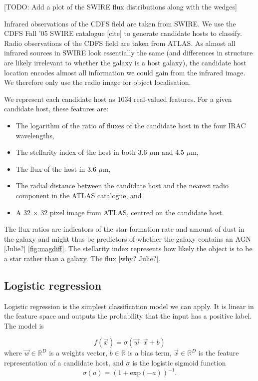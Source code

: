 \documentclass[fleqn,usenatbib,usedcolumn]{mnras}
\begin{document}
    {[}TODO: Add a plot of the SWIRE flux distributions along with the
    wedges{]}

    Infrared observations of the CDFS field are taken from SWIRE. We use the
    CDFS Fall '05 SWIRE catalogue {[}cite{]} to generate candidate hosts to
    classify. Radio observations of the CDFS field are taken from ATLAS. As
    almost all infrared sources in SWIRE look essentially the same (and
    differences in structure are likely irrelevant to whether the galaxy is
    a host galaxy), the candidate host location encodes almost all
    information we could gain from the infrared image. We therefore only use
    the radio image for object localisation.

    We represent each candidate host as 1034 real-valued features. For a given
    candidate host, these features are:
    \begin{itemize}
      \item The logarithm of the ratio of fluxes of the candidate host in the
        four IRAC wavelengths,
      \item The stellarity index of the host in both 3.6 $\mu$m and 4.5
        $\mu$m,
      \item The flux of the host in 3.6 $\mu$m,
      \item The radial distance between the candidate host and the nearest
        radio component in the ATLAS catalogue, and
      \item A 32 $\times$ 32 pixel image from ATLAS, centred on the candidate
        host.
    \end{itemize}

    The flux ratios are indicators of the star formation rate and amount of
    dust in the galaxy and might thus be predictors of whether the galaxy
    contains an AGN {[}Julie?{]} \ref{fig:magdiff}. The stellarity index
    represents how likely the object is to be a star rather than a galaxy.
    The flux {[}why? Julie?{]}.

  \subsection{Logistic regression}\label{logistic-regression}

    Logistic regression is the simplest classification model we can apply.
    It is linear in the feature space and outputs the probability that the
    input has a positive label. The model is

    \[
        f(\vec x) = \sigma(\vec w \cdot \vec x + b)
    \] where \(\vec w \in \mathbb{R}^D\) is a weights vector,
    \(b \in \mathbb{R}\) is a bias term, \(\vec x \in \mathbb{R}^D\) is the
    feature representation of a candidate host, and \(\sigma\) is the
    logistic sigmoid function \[
        \sigma(a) = (1 + \mathrm{exp}(-a))^{-1}.
    \]
\end{document}
